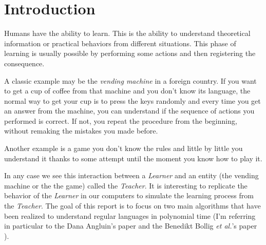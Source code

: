 \section{Introduction}




Humans have the ability to learn. This is the ability to understand theoretical information or practical behaviors from different situations. This phase of learning is usually possible by performing some actions and then registering the consequence.

A classic example may be the \textit{vending machine} in a foreign country. If you want to get a cup of coffee from that machine and you don't know its language, the normal way to get your cup is to press the keys randomly and every time you get an answer from the machine, you can understand if the sequence of actions you performed is correct. If not, you repeat the procedure from the beginning, without remaking the mistakes you made before.

Another example is a game you don't know the rules and little by little you understand it thanks to some attempt until the moment you know how to play it.

In any case we see this interaction between a \textit{Learner} and an entity (the vending machine or the the game) called the \textit{Teacher}. It is interesting to replicate the behavior of the \textit{Learner} in our computers to simulate the learning process from the \textit{Teacher}. The goal of this report is to focus on two main algorithms that have been realized to understand regular languages in polynomial time (I'm referring in particular to the Dana Angluin's paper \cite{LPaper} and the Benedikt Bollig \textit{et al.}'s paper \cite{NLPaper}).

